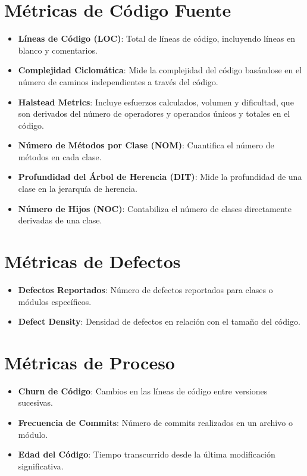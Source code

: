 \section*{Métricas de Código Fuente}
\begin{itemize}
  \item \textbf{Líneas de Código (LOC)}: Total de líneas de código, incluyendo líneas en blanco y comentarios.
  \item \textbf{Complejidad Ciclomática}: Mide la complejidad del código basándose en el número de caminos independientes a través del código.
  \item \textbf{Halstead Metrics}: Incluye esfuerzos calculados, volumen y dificultad, que son derivados del número de operadores y operandos únicos y totales en el código.
  \item \textbf{Número de Métodos por Clase (NOM)}: Cuantifica el número de métodos en cada clase.
  \item \textbf{Profundidad del Árbol de Herencia (DIT)}: Mide la profundidad de una clase en la jerarquía de herencia.
  \item \textbf{Número de Hijos (NOC)}: Contabiliza el número de clases directamente derivadas de una clase.
\end{itemize}

\section*{Métricas de Defectos}
\begin{itemize}
  \item \textbf{Defectos Reportados}: Número de defectos reportados para clases o módulos específicos.
  \item \textbf{Defect Density}: Densidad de defectos en relación con el tamaño del código.
\end{itemize}

\section*{Métricas de Proceso}
\begin{itemize}
  \item \textbf{Churn de Código}: Cambios en las líneas de código entre versiones sucesivas.
  \item \textbf{Frecuencia de Commits}: Número de commits realizados en un archivo o módulo.
  \item \textbf{Edad del Código}: Tiempo transcurrido desde la última modificación significativa.
\end{itemize}


